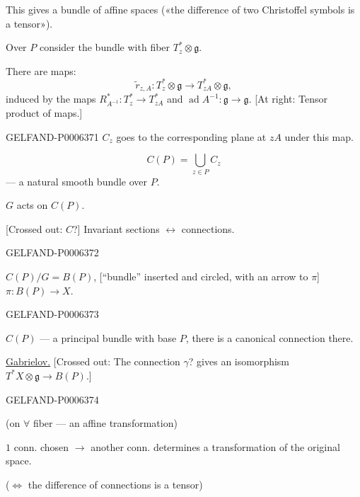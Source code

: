 This gives a bundle of affine spaces
(«the difference of two Christoffel symbols is a tensor»).

Over \(P\) consider the bundle with fiber \(T_z^*\otimes\mathfrak g\).

There are maps:
\[
\widetilde r_{z,A}:T_z^*\otimes\mathfrak g\to T_{zA}^*\otimes\mathfrak g,
\]
induced by the maps
\(R_{A^{-1}}^*:T_z^*\to T_{zA}^*\) and
\(\operatorname{ad}A^{-1}:\mathfrak g\to\mathfrak g\).
[At right: Tensor product of maps.]


\begin{GelfandAdjacentEvidence}{GELFAND-P000637}{1}
\(C_z\) goes to the corresponding plane at \(zA\) under this map.

\[
C(P)=\bigcup_{z\in P}C_z
\]
--- a natural smooth bundle over \(P\).

\(G\) acts on \(C(P)\).

[Crossed out: \(C\)?] Invariant sections \(\longleftrightarrow\) connections.
\end{GelfandAdjacentEvidence}
\begin{GelfandAdjacentEvidence}{GELFAND-P000637}{2}


\underline{\(C(P)/G=B(P)\)}, [“bundle” inserted and circled, with an arrow to \(\pi\)]
\(\pi:B(P)\to X\).
\end{GelfandAdjacentEvidence}
\begin{GelfandAdjacentEvidence}{GELFAND-P000637}{3}


\(C(P)\) --- a principal bundle with base \(P\), there is a canonical connection there.

\underline{Gabrielov.}
[Crossed out: The connection \(\gamma\)? gives an isomorphism
\(T^*X\otimes\mathfrak g\to B(P)\).]
\end{GelfandAdjacentEvidence}
\begin{GelfandAdjacentEvidence}{GELFAND-P000637}{4}


(on \(\forall\) fiber --- an affine transformation)

\(1\) conn. chosen \(\to\) another conn. determines a transformation of the original space.

(\(\Longleftrightarrow\) the difference of connections is a tensor)

\end{GelfandAdjacentEvidence}


